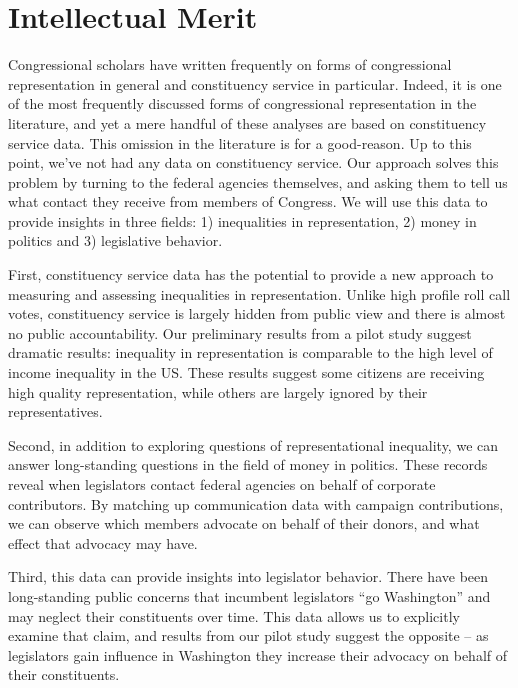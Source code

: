 \documentclass{article}
\begin{document}

\section*{Intellectual Merit}

Congressional scholars have written frequently on forms of congressional representation in general and constituency service in particular. Indeed, it is one of the most frequently discussed forms of congressional representation in the literature, and yet a mere handful of these analyses are based on constituency service data. This omission in the literature is for a good-reason. Up to this point, we've not had any data on constituency service. Our approach solves this problem by turning to the federal agencies themselves, and asking them to tell us what contact they receive from members of Congress. We will use this data to provide insights in three fields: 1) inequalities in representation, 2) money in politics and 3) legislative behavior. 

First, constituency service data has the potential to provide a new approach to measuring and assessing inequalities in representation. Unlike high profile roll call votes, constituency service is largely hidden from public view and there is almost no public accountability. Our preliminary results from a pilot study suggest dramatic results: inequality in representation is comparable to the high level of income inequality in the US. These results suggest some citizens are receiving high quality representation, while others are largely ignored by their representatives. 

Second, in addition to exploring questions of representational inequality, we can answer long-standing questions in the field of money in politics. These records reveal when legislators contact federal agencies on behalf of corporate contributors. By matching up communication data with campaign contributions, we can observe which members advocate on behalf of their donors, and what effect that advocacy may have. 

Third, this data can provide insights into legislator behavior.  There have been long-standing public concerns that incumbent legislators ``go Washington'' and may neglect their constituents over time. This data allows us to explicitly examine that claim, and results from our pilot study suggest the opposite – as legislators gain influence in Washington they increase their advocacy on behalf of their constituents. 
\end{document}
